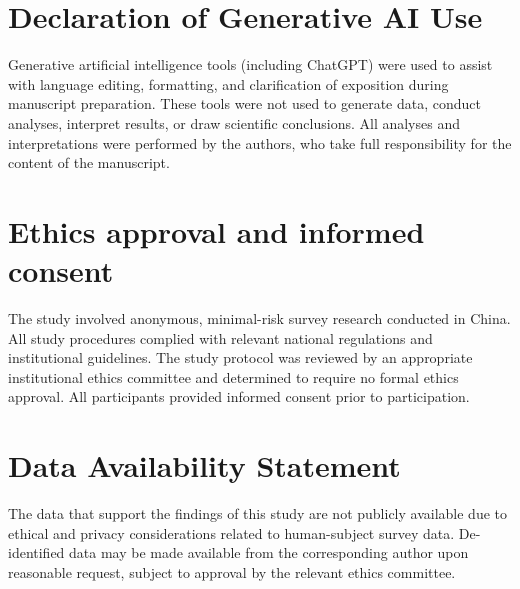 \documentclass[preprint,12pt]{elsarticle}
\begin{document}
\section*{Declaration of Generative AI Use}

Generative artificial intelligence tools (including ChatGPT) were used to assist with language
editing, formatting, and clarification of exposition during manuscript preparation. These tools
were not used to generate data, conduct analyses, interpret results, or draw scientific
conclusions. All analyses and interpretations were performed by the authors, who take full
responsibility for the content of the manuscript.

\section*{Ethics approval and informed consent}

The study involved anonymous, minimal-risk survey research conducted in China. All study
procedures complied with relevant national regulations and institutional guidelines. The study
protocol was reviewed by an appropriate institutional ethics committee and determined to
require no formal ethics approval. All participants provided informed consent prior to
participation.

\section*{Data Availability Statement}

The data that support the findings of this study are not publicly available due to ethical and privacy considerations related to human-subject survey data. De-identified data may be made available from the corresponding author upon reasonable request, subject to approval by the relevant ethics committee.



\clearpage









\clearpage

\appendix

\clearpage

\clearpage

\clearpage

\clearpage
%
\end{document}
